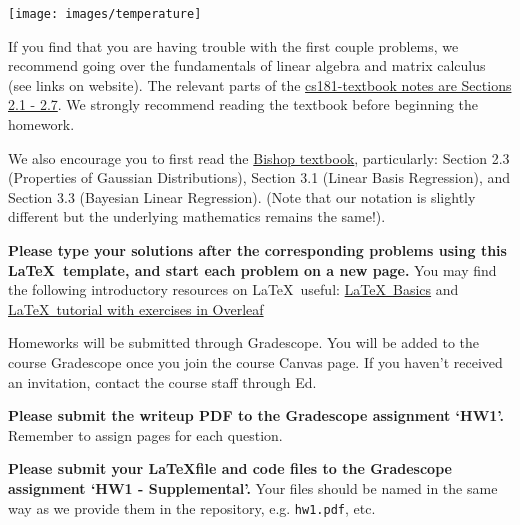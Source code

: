 \documentclass[submit]{harvardml}
\begin{document}
\begin{center}
\texttt{[image: images/temperature]}
\end{center}
\noindent 


If you find that you are having trouble with the first couple
problems, we recommend going over the fundamentals of linear algebra
and matrix calculus (see links on website).  The relevant parts of the
\href{https://github.com/harvard-ml-courses/cs181-textbook/blob/master/Textbook.pdf}{cs181-textbook notes are Sections 2.1 - 2.7}.  We strongly recommend
reading the textbook before beginning the homework.

We also encourage you to first read the \href{http://users.isr.ist.utl.pt/~wurmd/Livros/school/Bishop\%20-\%20Pattern\%20Recognition\%20And\%20Machine\%20Learning\%20-\%20Springer\%20\%202006.pdf}{Bishop textbook}, particularly:
Section 2.3 (Properties of Gaussian Distributions), Section 3.1
(Linear Basis Regression), and Section 3.3 (Bayesian Linear
Regression). (Note that our notation is slightly different but the
underlying mathematics remains the same!).

\textbf{Please type your solutions after the corresponding problems using this
\LaTeX\ template, and start each problem on a new page.} You may find
the following introductory resources on \LaTeX\ useful: 
\href{http://www.mjdenny.com/workshops/LaTeX_Intro.pdf}{\LaTeX\ Basics} 
and \href{https://www.overleaf.com/learn/latex/Free_online_introduction_to_LaTeX_(part_1)}{\LaTeX\ tutorial with exercises in Overleaf}

Homeworks will be submitted through Gradescope. You will be added to
the course Gradescope once you join the course Canvas page. If you
haven't received an invitation, contact the course staff through Ed.

\textbf{Please submit the writeup PDF to the Gradescope assignment
  `HW1'.} Remember to assign pages for each question.

\textbf{Please submit your \LaTeX file and code files to the
  Gradescope assignment `HW1 - Supplemental'.} Your files should be
named in the same way as we provide them in the repository,
e.g. \texttt{hw1.pdf}, etc.
\end{document}
